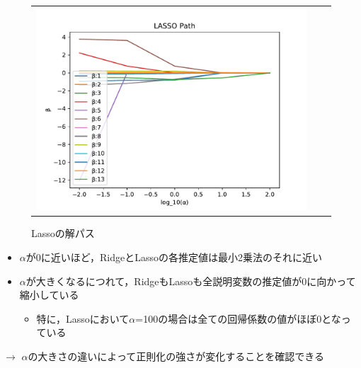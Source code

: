 \documentclass[dvipdfmx, 10pt]{beamer}
\begin{document}
\begin{frame}{\insertsubsection}
\begin{figure}[H]
\begin{tabular}{ccc}
\begin{minipage}{0.33\hsize}
            		 \caption{Ridgeの解パス}
            		 \label{fig:ridge}
            	 \end{minipage}
            	 \begin{minipage}{0.33\hsize}
                   	 \includegraphics[width=1.0\linewidth]{../img/lassoPath.pdf}
            		 \caption{Lassoの解パス}
            		 \label{fig:lasso}
            	 \end{minipage}
    	     \end{tabular}
    \end{figure}
    \begin{itemize}
        \item $\alpha$が0に近いほど，RidgeとLassoの各推定値は最小2乗法のそれに近い
        \item $\alpha$が大きくなるにつれて，RidgeもLassoも全説明変数の推定値が0に向かって縮小している
         \begin{itemize}
            \item 特に，Lassoにおいて$\alpha$=100の場合は全ての回帰係数の値がほぼ0となっている
         \end{itemize}
    \end{itemize}
    $\rightarrow$ $\alpha$の大きさの違いによって正則化の強さが変化することを確認できる
\end{frame}
\end{document}
